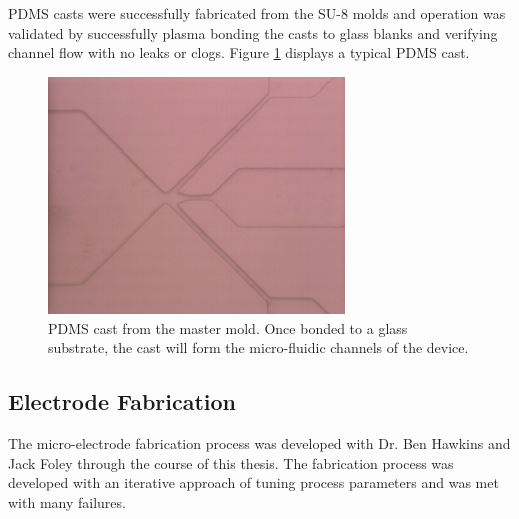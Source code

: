 \par PDMS casts were successfully fabricated from the SU-8 molds and operation was validated by successfully plasma bonding the casts to glass blanks and verifying channel flow with no leaks or clogs. Figure \ref{fig:pdms_results} displays a typical PDMS cast.

\begin{figure}[H]
    \centering
    \includegraphics[width=0.7\textwidth]{images/PDMS_channels.png}
    \caption{PDMS cast from the master mold. Once bonded to a glass substrate, the cast will form the micro-fluidic channels of the device.}
    \label{fig:pdms_results}
\end{figure}

\FloatBarrier


\subsection{Electrode Fabrication}

\par The micro-electrode fabrication process was developed with Dr. Ben Hawkins and Jack Foley through the course of this thesis. The fabrication process was developed with an iterative approach of tuning process parameters and was met with many failures.

